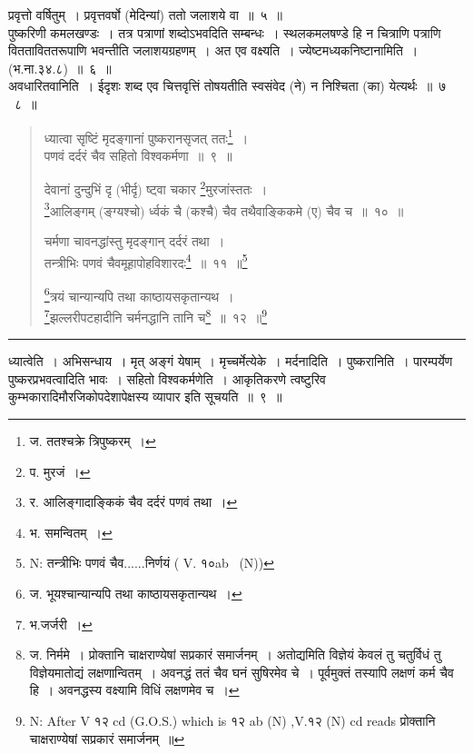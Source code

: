 \documentclass[11pt, openany]{book}
\begin{document}
{\qtt प्रवृत्तो} वर्षितुम्~। प्रवृत्तवर्षो (मेदिन्यां) ततो जलाशये वा~॥~५~॥\\

{\qtt  पुष्करिणी} कमलखण्डः~। तत्र पत्राणां शब्दोऽभवदिति सम्बन्धः~। स्थलकमलषण्डे हि न चित्राणि पत्राणि वितताविततरूपाणि भवन्तीति जलाशयग्रहणम्~। अत एव वक्ष्यति~। {\qtt ज्येष्टमध्यकनिष्टानामिति}~।  (भ.ना.३४.८)~॥~६~॥\\

{\qtt अवधारितवानिति}~। ईदृशः शब्द एव चित्तवृत्तिं तोषयतीति स्वसंवेद (ने) न निश्चिता (का) येत्यर्थः~॥~७ \textendash\ ८~॥

\newpage

\begin{quote}
{\na  ध्यात्वा सृष्टिं मृदङ्गानां पुष्करानसृजत् ततः\renewcommand{\thefootnote}{1}\footnote{ज. ततश्चक्रे त्रिपुष्करम्~।}~।\\
 पणवं दर्दरं चैव सहितो विश्वकर्मणा~॥~९~॥

 देवानां दुन्दुभिं दृ (भीर्दृ) ष्ट्वा चकार \renewcommand{\thefootnote}{2}\footnote{प. मुरजं~।}मुरजांस्ततः~।\\
 \renewcommand{\thefootnote}{3}\footnote{र. आलिङ्गादाङ्किकं चैव दर्दरं पणवं तथा~।}आलिङ्गम् (ङ्ग्यश्चो) र्ध्वकं चै (कश्चै) चैव तथैवाङ्किकमे (ए) चैव च~॥~१०~॥

 चर्मणा चावनद्धांस्तु मृदङ्गान् दर्दरं तथा~।\\
 तन्त्रीभिः पणवं चैवमूहापोहविशारदः\renewcommand{\thefootnote}{4}\footnote{भ. समन्वितम्~।}~॥~११~॥\renewcommand{\thefootnote}{4a}\footnote{N: तन्त्रीभिः पणवं चैव......निर्णयं ( V. १०ab \textendash\  (N))}

 \renewcommand{\thefootnote}{5}\footnote{ज. भूयश्चान्यान्यपि तथा काष्ठायसकृतान्यथ~।}त्रयं चान्यान्यपि तथा काष्ठायसकृतान्यथ~।\\
 \renewcommand{\thefootnote}{6}\footnote{भ.जर्जरी~।}झल्लरीपटहादीनि चर्मनद्धानि तानि च\renewcommand{\thefootnote}{7}\footnote{ज. निर्ममे~। प्रोक्तानि चाक्षराण्येषां सप्रकारं समार्जनम्~। अतोद्यमिति विज्ञेयं केवलं तु चतुर्विधं तु विज्ञेयमातोद्यं लक्षणान्वितम्~। अवनद्धं ततं चैव घनं सुषिरमेव चे~। पूर्वमुक्तं तस्यापि लक्षणं कर्म चैव हि~। अवनद्धस्य वक्ष्यामि विधिं लक्षणमेव च~।}~॥~१२~॥\renewcommand{\thefootnote}{7a}\footnote{N: After V १२ cd (G.O.S.)  which is १२ ab (N) ,V.१२ (N) cd reads प्रोक्तानि चाक्षराण्येषां सप्रकारं समार्जनम्~॥}}
\end{quote}

\hrule

\vspace{2mm}
ध्यात्वेति~। {\qtt अभिसन्धाय}~। मृत् अङ्गं येषाम्~। {\qtt मृच्चर्मेत्येके}~। मर्दनादिति~। {\qtt पुष्करानिति}~। पारम्पर्येण पुष्करप्रभवत्वादिति भावः~। सहितो विश्वकर्मणेति~। आकृतिकरणे त्वष्टुरिव कुम्भकारादिमौरजिकोपदेशापेक्षस्य व्यापार इति सूचयति~॥~९~॥\\
\end{document}
